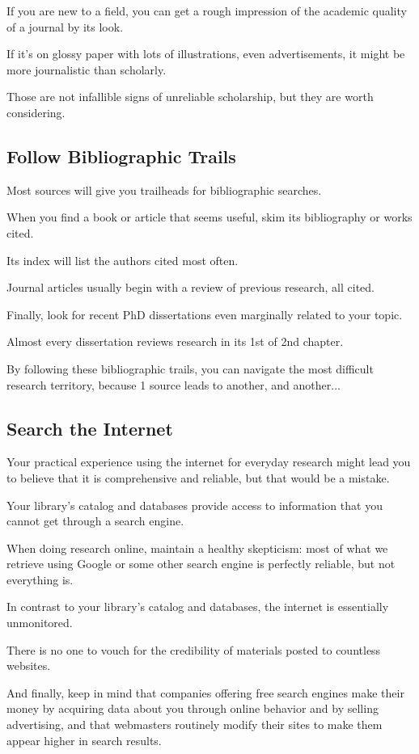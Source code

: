 \documentclass[oneside]{book}
\numberwithin{equation}{section}
\begin{document}
%
If you are new to a field, you can get a rough impression of the academic quality of a journal by its look.

If it's on glossy paper with lots of illustrations, even advertisements, it might be more journalistic than scholarly.

Those are not infallible signs of unreliable scholarship, but they are worth considering.

\subsection{Follow Bibliographic Trails}
Most sources will give you trailheads for bibliographic searches.

When you find a book or article that seems useful, skim its bibliography or works cited.

Its index will list the authors cited most often.

Journal articles usually begin with a review of previous research, all cited.

Finally, look for recent PhD dissertations even marginally related to your topic.

Almost every dissertation reviews research in its 1st of 2nd chapter.

By following these bibliographic trails, you can navigate the most difficult research territory, because 1 source leads to another, and another$\ldots$

\subsection{Search the Internet}
Your practical experience using the internet for everyday research might lead you to believe that it is comprehensive and reliable, but that would be a mistake.

Your library's catalog and databases provide access to information that you cannot get through a search engine.

When doing research online, maintain a healthy skepticism: most of what we retrieve using Google or some other search engine is perfectly reliable, but not everything is.

In contrast to your library's catalog and databases, the internet is essentially unmonitored.

There is no one to vouch for the credibility of materials posted to countless websites.

And finally, keep in mind that companies offering free search engines make their money by acquiring data about you through online behavior and by selling advertising, and that webmasters routinely modify their sites to make them appear higher in search results.
\end{document}
